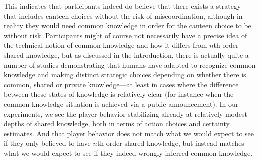 \documentclass[twocolumn,a4paper,superscriptaddress,nofootinbib]{revtex4}
\newcommand{\tobo}[1]{{\color{red} TOBO: #1}}
\newcommand{\tsn}[1]{{\color{blue} TSN: #1}}
\newcommand{\re}[1]{{\color{brown} RE: #1}}
\begin{document}
This indicates that participants indeed do believe that there exists a strategy that includes canteen choices without the risk of miscoordination, although in reality they would need common knowledge in order for the canteen choice to be without risk.
Participants might of course not necessarily have a precise idea of the technical notion of common knowledge and how it differs from $n$th-order shared knowledge, but as discussed in the introduction, there is actually quite a number of studies demonstrating that humans have adapted to recognize common knowledge and making distinct strategic choices depending on whether there is common, shared or private knowledge---at least in cases where the difference between these states of knowledge is relatively clear (for instance when the common knowledge situation is achieved via a public announcement). In our experiments, we see the player behavior stabilizing already at relatively modest depths of shared knowledge, both in terms of action choices and certainty estimates. And that player behavior does not match what we would expect to see if they only believed to have $n$th-order shared knowledge, but instead matches what we would expect to see if they indeed wrongly inferred common knowledge. 
\end{document}
